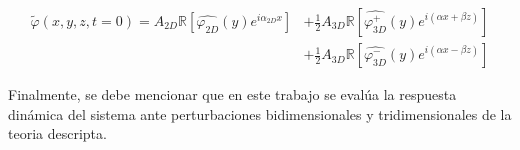 \begin{equation}
\begin{aligned}
\widetilde{\varphi}(x,y,z,t=0) = A_{2D} \mathbb{R} \left[ \widehat{\varphi^{}_{2D}}(y) e^{\mathit{i} \alpha_{2D} x} \right] &+ \frac{1}{2} A_{3D} \mathbb{R} \left[ \widehat{\varphi^{+}_{3D}}(y) e^{\mathit{i} ( \alpha x + \beta z)} \right] \\
 &+ \frac{1}{2} A_{3D} \mathbb{R} \left[ \widehat{\varphi^{-}_{3D}}(y) e^{\mathit{i} ( \alpha x - \beta z)} \right]
\end{aligned}
\label{eq:init_con_3}
\end{equation}

Finalmente, se debe mencionar que en este trabajo se evalúa la respuesta dinámica del sistema ante perturbaciones bidimensionales y tridimensionales de la teoria descripta.